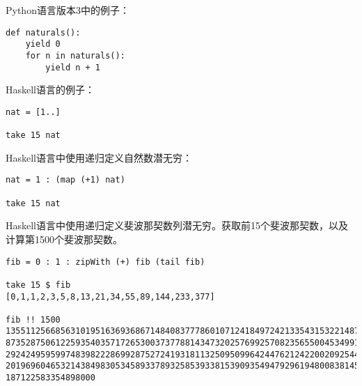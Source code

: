 \documentclass{article}
\begin{document}
Python语言版本3中的例子：

\lstset{frame=single, language=Python}
\begin{lstlisting}
def naturals():
    yield 0
    for n in naturals():
        yield n + 1
\end{lstlisting}

Haskell语言的例子：

\lstset{frame=single, language=Haskell}
\begin{lstlisting}
nat = [1..]

take 15 nat
\end{lstlisting}

Haskell语言中使用递归定义自然数潜无穷：

\lstset{frame=single, language=Haskell}
\begin{lstlisting}
nat = 1 : (map (+1) nat)

take 15 nat
\end{lstlisting}

Haskell语言中使用递归定义斐波那契数列潜无穷。获取前15个斐波那契数，以及计算第1500个斐波那契数。

\lstset{frame=single, language=Haskell}
\begin{lstlisting}
fib = 0 : 1 : zipWith (+) fib (tail fib)

take 15 $ fib
[0,1,1,2,3,5,8,13,21,34,55,89,144,233,377]

fib !! 1500
13551125668563101951636936867148408377786010712418497242133543153221487310
87352875061225935403571726530037377881434732025769925708235655004534991410
29242495959974839822286992875272419318113250950996424476212422002092544399
20196960465321438498305345893378932585393381539093549479296194800838145996
187122583354898000
\end{lstlisting}

\end{document}
